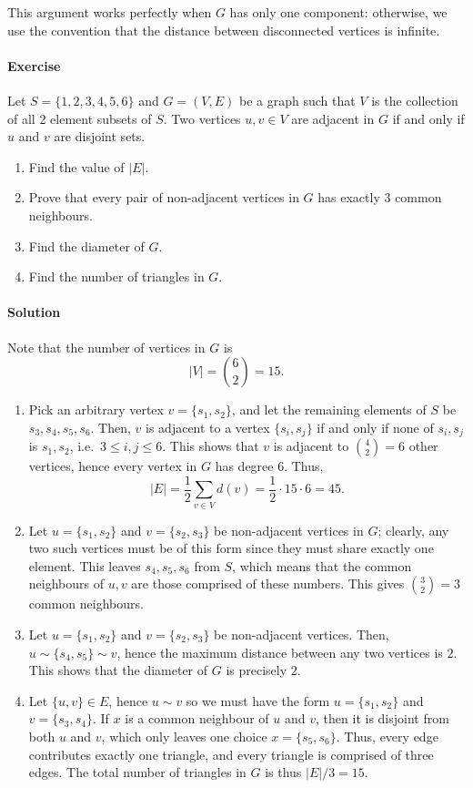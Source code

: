 \documentclass[10pt]{article}
\newcounter{prob}
\newcommand{\problem}{\stepcounter{prob}\paragraph{Exercise \arabic{prob}}}
\newcommand{\solution}{\paragraph{Solution}}
\begin{document}
    This argument works perfectly when $G$ has only one component: otherwise, we use
    the convention that the distance between disconnected vertices is infinite.


    \problem Let $S = \{1, 2, 3, 4, 5, 6\}$ and $G = (V, E)$ be a graph such that $V$
    is the collection of all 2 element subsets of $S$. Two vertices $u, v \in V$ are
    adjacent in $G$ if and only if $u$ and $v$ are disjoint sets.
    \begin{enumerate}
        \item Find the value of $|E|$.
        \item Prove that every pair of non-adjacent vertices in $G$ has exactly 3
        common neighbours.
        \item Find the diameter of $G$.
        \item Find the number of triangles in $G$.
    \end{enumerate}

    \solution Note that the number of vertices in $G$ is \[
        |V| = \binom{6}{2} = 15.
    \] 
    \begin{enumerate}
        \item Pick an arbitrary vertex $v = \{s_1, s_2\}$, and let the remaining elements
        of $S$ be $s_3, s_4, s_5, s_6$. Then, $v$ is adjacent to a vertex $\{s_i,
        s_j\}$ if and only if none of $s_i, s_j$ is $s_1, s_2$, i.e.\ $3 \leq i, j
        \leq 6$. This shows that $v$ is adjacent to $\binom{4}{2} = 6$ other
        vertices, hence every vertex in $G$ has degree $6$. Thus, \[
            |E| = \frac{1}{2}\sum_{v \in V} d(v) = \frac{1}{2}\cdot 15 \cdot 6 = 45.
        \] 

        \item Let $u = \{s_1, s_2\}$ and $v = \{s_2, s_3\}$ be non-adjacent vertices
        in $G$; clearly, any two such vertices must be of this form since they must
        share exactly one element. This leaves $s_4, s_5, s_6$ from $S$, which means
        that the common neighbours of $u, v$ are those comprised of these numbers.
        This gives $\binom{3}{2} = 3$ common neighbours.

        \item Let $u = \{s_1, s_2\}$ and $v = \{s_2, s_3\}$ be non-adjacent vertices.
        Then, $u \sim \{s_4, s_5\} \sim v$, hence the maximum distance between any
        two vertices is $2$. This shows that the diameter of $G$ is precisely $2$.

        \item Let $\{u, v\} \in E$, hence $u \sim v$ so we must have the form $u =
        \{s_1, s_2\}$ and $v = \{s_3, s_4\}$. If $x$ is a common neighbour of $u$ and
        $v$, then it is disjoint from both $u$ and $v$, which only leaves one choice
        $x = \{s_5, s_6\}$. Thus, every edge contributes exactly one triangle, and
        every triangle is comprised of three edges. The total number of triangles in
        $G$ is thus $|E| / 3 = 15$.
    \end{enumerate}
\end{document}
